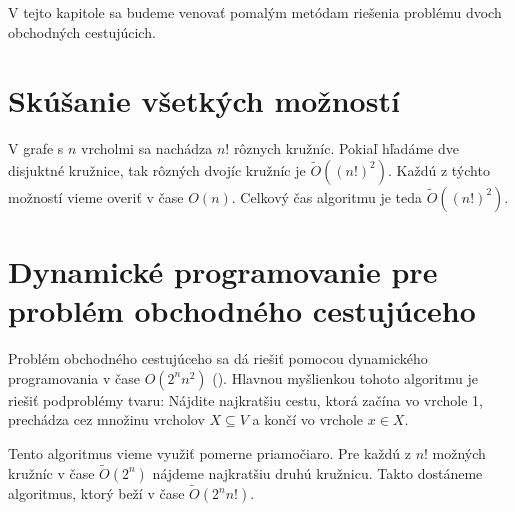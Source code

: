 V tejto kapitole sa budeme venovať pomalým metódam riešenia problému
dvoch obchodných cestujúcich.

\section{Skúšanie všetkých možností}

V grafe s $n$ vrcholmi sa nachádza $n!$ rôznych kružníc. Pokiaľ hľadáme
dve disjuktné kružnice, tak rôzných dvojíc kružníc je $\tilde{O}((n!)^2)$.
Každú z týchto možností vieme overiť v čase $O(n)$. Celkový čas algoritmu
je teda $\tilde{O}((n!)^2)$.

\section{Dynamické programovanie pre problém obchodného cestujúceho}

Problém obchodného cestujúceho sa dá riešiť pomocou dynamického
programovania v čase $O(2^n n^2)$ (\cite{Held}). Hlavnou myšlienkou
tohoto algoritmu je riešiť podproblémy tvaru: Nájdite najkratšiu cestu, ktorá
začína vo vrchole 1, prechádza cez množinu vrcholov $X \subseteq V$ a končí vo vrchole
$x \in X$.

Tento algoritmus vieme využiť pomerne priamočiaro. Pre každú z $n!$ možných kružníc
v čase $\tilde{O}(2^n)$ nájdeme najkratšiu druhú kružnicu. Takto dostáneme
algoritmus, ktorý beží v čase $\tilde{O}(2^n n!)$. 

